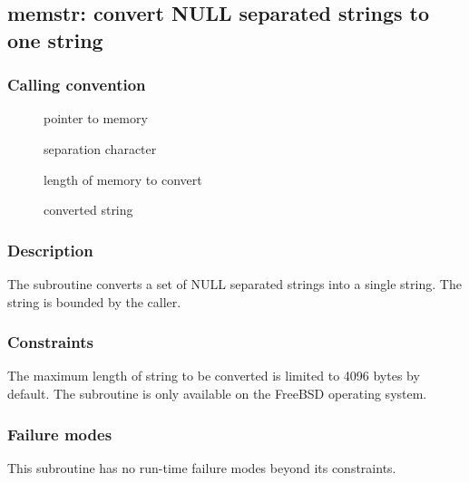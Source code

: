 \clearpage
{}
{}
\label{subr:memstr}
\subsection*{memstr: convert NULL separated strings to one string}

\subsubsection*{Calling convention}

\begin{description}
\item[] pointer to memory
\item[] separation character
\item[] length of memory to convert
\item[] converted string
\end{description}

\subsubsection*{Description}

The  subroutine converts a set of NULL separated
strings into a single string.  The string is bounded by the caller.


\subsubsection*{Constraints}

The maximum length of string to be converted is limited to 4096 bytes
by default.  The  subroutine is only available on
the FreeBSD operating system.

\subsubsection*{Failure modes}

This subroutine has no run-time failure modes beyond its constraints.
